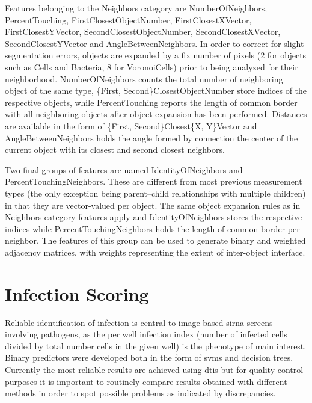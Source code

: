 Features belonging to the Neighbors category are NumberOfNeighbors, PercentTouching, FirstClosestObjectNumber, FirstClosestXVector, FirstClosestYVector, SecondClosestObjectNumber, SecondClosestXVector, SecondClosestYVector and AngleBetweenNeighbors. In order to correct for slight segmentation errors, objects are expanded by a fix number of pixels (2 for objects such as Cells and Bacteria, 8 for VoronoiCells) prior to being analyzed for their neighborhood. NumberOfNeighbors counts the total number of neighboring object of the same type, \{First, Second\}ClosestObjectNumber store indices of the respective objects, while PercentTouching reports the length of common border with all neighboring objects after object expansion has been performed. Distances are available in the form of \{First, Second\}Closest\{X, Y\}Vector and AngleBetweenNeighbors holds the angle formed by connection the center of the current object with its closest and second closest neighbors.

Two final groups of features are named IdentityOfNeighbors and PercentTouchingNeighbors. These are different from most previous measurement types (the only exception being parent--child relationships with multiple children) in that they are vector-valued per object. The same object expansion rules as in Neighbors category features apply and IdentityOfNeighbors stores the respective indices while PercentTouchingNeighbors holds the length of common border per neighbor. The features of this group can be used to generate binary and weighted adjacency matrices, with weights representing the extent of inter-object interface.

\section{Infection Scoring}
\label{sec:infection-scoring}
Reliable identification of infection is central to image-based \gls{sirna} screens involving pathogens, as the per well infection index (number of infected cells divided by total number cells in the given well) is the phenotype of main interest. Binary predictors were developed both in the form of \glspl{svm} and decision trees. Currently the most reliable results are achieved using \gls{dtis} but for quality control purposes it is important to routinely compare results obtained with different methods in order to spot possible problems as indicated by discrepancies.

